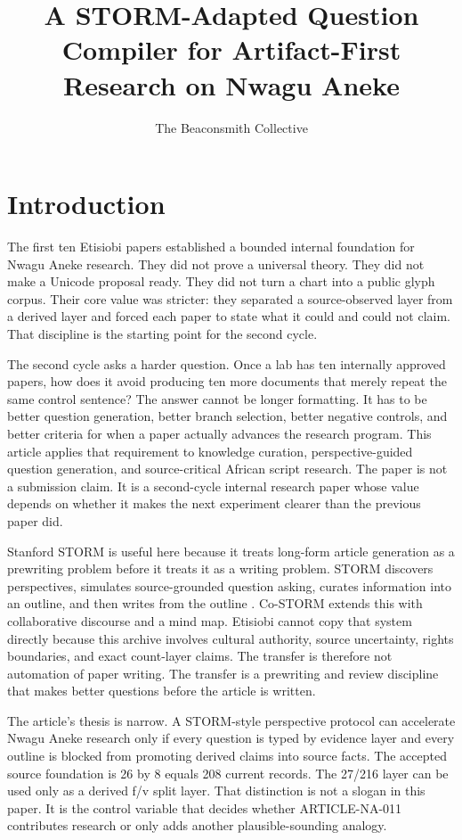 \documentclass[sigconf,nonacm]{acmart}
\title{A STORM-Adapted Question Compiler for Artifact-First Research on Nwagu Aneke}
\author{The Beaconsmith Collective}
\affiliation{\institution{Etisiobi Research Studio}\city{Enugu}\country{Nigeria}}
\begin{document}
\maketitle

\section{Introduction}
The first ten Etisiobi papers established a bounded internal foundation for
Nwagu Aneke research. They did not prove a universal theory. They did not make a
Unicode proposal ready. They did not turn a chart into a public glyph corpus.
Their core value was stricter: they separated a source-observed layer from a
derived layer and forced each paper to state what it could and could not claim.
That discipline is the starting point for the second cycle.

The second cycle asks a harder question. Once a lab has ten internally approved
papers, how does it avoid producing ten more documents that merely repeat the
same control sentence? The answer cannot be longer formatting. It has to be
better question generation, better branch selection, better negative controls,
and better criteria for when a paper actually advances the research program.
This article applies that requirement to knowledge curation, perspective-guided question generation, and source-critical African script research. The paper is not a submission
claim. It is a second-cycle internal research paper whose value depends on
whether it makes the next experiment clearer than the previous paper did.

Stanford STORM is useful here because it treats long-form article generation as
a prewriting problem before it treats it as a writing problem. STORM discovers
perspectives, simulates source-grounded question asking, curates information
into an outline, and then writes from the outline \cite{shao2024storm,jiang2024costorm,gao2023alce,wadden2020scifact}. Co-STORM
extends this with collaborative discourse and a mind map. Etisiobi cannot copy
that system directly because this archive involves cultural authority, source
uncertainty, rights boundaries, and exact count-layer claims. The transfer is
therefore not automation of paper writing. The transfer is a prewriting and
review discipline that makes better questions before the article is written.

The article's thesis is narrow. A STORM-style perspective protocol can accelerate
Nwagu Aneke research only if every question is typed by evidence layer and every
outline is blocked from promoting derived claims into source facts. The accepted
source foundation is 26 by 8 equals 208 current records. The 27/216 layer can be
used only as a derived f/v split layer. That distinction is not a slogan in this
paper. It is the control variable that decides whether ARTICLE-NA-011 contributes
research or only adds another plausible-sounding analogy.
\end{document}

